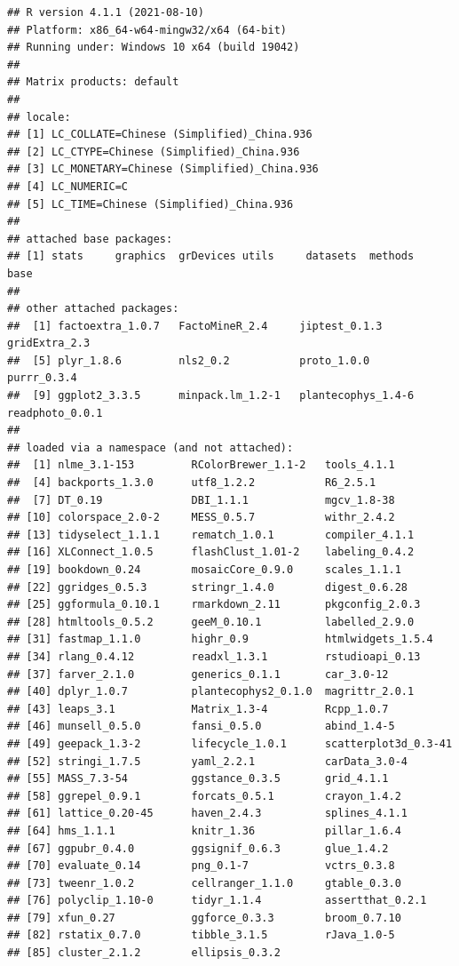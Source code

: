 \documentclass[
]{krantz}
\begin{document}
\begin{verbatim}
## R version 4.1.1 (2021-08-10)
## Platform: x86_64-w64-mingw32/x64 (64-bit)
## Running under: Windows 10 x64 (build 19042)
## 
## Matrix products: default
## 
## locale:
## [1] LC_COLLATE=Chinese (Simplified)_China.936 
## [2] LC_CTYPE=Chinese (Simplified)_China.936   
## [3] LC_MONETARY=Chinese (Simplified)_China.936
## [4] LC_NUMERIC=C                              
## [5] LC_TIME=Chinese (Simplified)_China.936    
## 
## attached base packages:
## [1] stats     graphics  grDevices utils     datasets  methods   base     
## 
## other attached packages:
##  [1] factoextra_1.0.7   FactoMineR_2.4     jiptest_0.1.3      gridExtra_2.3     
##  [5] plyr_1.8.6         nls2_0.2           proto_1.0.0        purrr_0.3.4       
##  [9] ggplot2_3.3.5      minpack.lm_1.2-1   plantecophys_1.4-6 readphoto_0.0.1   
## 
## loaded via a namespace (and not attached):
##  [1] nlme_3.1-153         RColorBrewer_1.1-2   tools_4.1.1         
##  [4] backports_1.3.0      utf8_1.2.2           R6_2.5.1            
##  [7] DT_0.19              DBI_1.1.1            mgcv_1.8-38         
## [10] colorspace_2.0-2     MESS_0.5.7           withr_2.4.2         
## [13] tidyselect_1.1.1     rematch_1.0.1        compiler_4.1.1      
## [16] XLConnect_1.0.5      flashClust_1.01-2    labeling_0.4.2      
## [19] bookdown_0.24        mosaicCore_0.9.0     scales_1.1.1        
## [22] ggridges_0.5.3       stringr_1.4.0        digest_0.6.28       
## [25] ggformula_0.10.1     rmarkdown_2.11       pkgconfig_2.0.3     
## [28] htmltools_0.5.2      geeM_0.10.1          labelled_2.9.0      
## [31] fastmap_1.1.0        highr_0.9            htmlwidgets_1.5.4   
## [34] rlang_0.4.12         readxl_1.3.1         rstudioapi_0.13     
## [37] farver_2.1.0         generics_0.1.1       car_3.0-12          
## [40] dplyr_1.0.7          plantecophys2_0.1.0  magrittr_2.0.1      
## [43] leaps_3.1            Matrix_1.3-4         Rcpp_1.0.7          
## [46] munsell_0.5.0        fansi_0.5.0          abind_1.4-5         
## [49] geepack_1.3-2        lifecycle_1.0.1      scatterplot3d_0.3-41
## [52] stringi_1.7.5        yaml_2.2.1           carData_3.0-4       
## [55] MASS_7.3-54          ggstance_0.3.5       grid_4.1.1          
## [58] ggrepel_0.9.1        forcats_0.5.1        crayon_1.4.2        
## [61] lattice_0.20-45      haven_2.4.3          splines_4.1.1       
## [64] hms_1.1.1            knitr_1.36           pillar_1.6.4        
## [67] ggpubr_0.4.0         ggsignif_0.6.3       glue_1.4.2          
## [70] evaluate_0.14        png_0.1-7            vctrs_0.3.8         
## [73] tweenr_1.0.2         cellranger_1.1.0     gtable_0.3.0        
## [76] polyclip_1.10-0      tidyr_1.1.4          assertthat_0.2.1    
## [79] xfun_0.27            ggforce_0.3.3        broom_0.7.10        
## [82] rstatix_0.7.0        tibble_3.1.5         rJava_1.0-5         
## [85] cluster_2.1.2        ellipsis_0.3.2
\end{verbatim}

\cleardoublepage

  

\backmatter
\printindex
\end{document}
